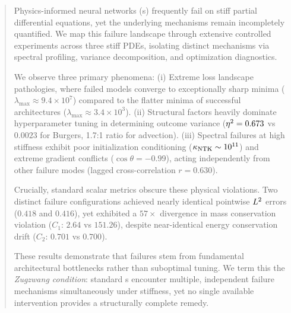 \begin{abstract}
Physics-informed neural networks (\PINN{}s) frequently fail on stiff partial differential equations, yet the underlying mechanisms remain incompletely quantified. We map this failure landscape through extensive controlled experiments across three stiff PDEs, isolating distinct mechanisms via spectral profiling, variance decomposition, and optimization diagnostics.

We observe three primary phenomena: (i) Extreme loss landscape pathologies, where failed models converge to exceptionally sharp minima ($\lambda_{\max} \approx 9.4 \times 10^7$) compared to the flatter minima of successful architectures ($\lambda_{\max} \approx 3.4 \times 10^3$). (ii) Structural factors heavily dominate hyperparameter tuning in determining outcome variance ($\etasq=0.673$ vs $0.0023$ for Burgers, 1.7:1 ratio for advection). (iii) Spectral failures at high stiffness exhibit poor initialization conditioning ($\kNTK \sim 10^{11}$) and extreme gradient conflicts ($\cos \theta = -0.99$), acting independently from other failure modes (lagged cross-correlation $r=0.630$).

Crucially, standard scalar metrics obscure these physical violations. Two distinct failure configurations achieved nearly identical pointwise $\Ltwo$ errors ($0.418$ and $0.416$), yet exhibited a $57\times$ divergence in mass conservation violation ($C_1$: $2.64$ vs $151.26$), despite near-identical energy conservation drift ($C_2$: $0.701$ vs $0.700$). 

These results demonstrate that \PINN{} failures stem from fundamental architectural bottlenecks rather than suboptimal tuning. We term this the \emph{Zugzwang condition}: standard \PINN{}s encounter multiple, independent failure mechanisms simultaneously under stiffness, yet no single available intervention provides a structurally complete remedy.
\end{abstract}
